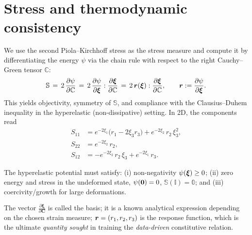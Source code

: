 \section{Stress and thermodynamic consistency}

We use the second Piola--Kirchhoff stress as the stress measure and compute it by differentiating the energy $\psi$ via the chain rule with respect to the right Cauchy--Green tensor $\mathbb C$:
\begin{equation}
  \mathbb S \,=\, 2\,\frac{\partial \psi}{\partial \mathbb C}
  \,=\, 2\,\frac{\partial \psi}{\partial \boldsymbol{\xi}} : \frac{\partial \boldsymbol{\xi}}{\partial \mathbb C}
  \,=\, 2\,\boldsymbol{r}(\boldsymbol{\xi}) : \frac{\partial \boldsymbol{\xi}}{\partial \mathbb C},\qquad \boldsymbol{r} := \frac{\partial \psi}{\partial \boldsymbol{\xi}}.
  \label{eq:chain-rule-en}
\end{equation}
This yields objectivity, symmetry of $\mathbb S$, and compliance with the Clausius--Duhem inequality in the hyperelastic (non-dissipative) setting. In 2D, the components read
\begin{equation}
\begin{aligned}
  S_{11} &= e^{-2\xi_1}\big(r_1-2\xi_3 r_3\big) + e^{-2\xi_2} \, r_2\,\xi_3^2,\\
  S_{22} &= e^{-2\xi_2} \, r_2,\\
  S_{12} &= -e^{-2\xi_2} \, r_2\,\xi_3 + e^{-2\xi_1} \, r_3.
\end{aligned}
\label{eq:stress_components_2d-en}
\end{equation}

The hyperelastic potential must satisfy: (i) non-negativity $\psi(\boldsymbol{\xi})\ge 0$; (ii) zero energy and stress in the undeformed state, $\psi(\boldsymbol{0})=0$, $\mathbb S(\mathbb I)=\mathbb 0$; and (iii) coercivity/growth for large deformations.

The vector $\frac{\partial \boldsymbol\xi}{\partial \mathbf{C}}$ is called the basis; it is a known analytical expression depending on the chosen strain measure; $\boldsymbol{r} = (r_1, r_2, r_3)$ is the response function, which is the ultimate \textit{quantity sought} in training the \textit{data-driven} constitutive relation.  

